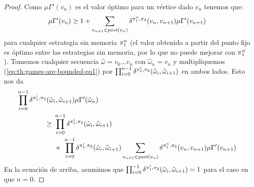 \begin{proof}
  Como $\mu \Gamma'(v_n)$ es el valor óptimo para un vértice dado $v_{n}$ tenemos que:
  \begin{equation}\label{eq:th:games-are-bounded-eq1}
    \mu \Gamma'(v_n) \geq 1 + \sum_{v_{n+1} \in \mathit{post}(v_n)} \delta^{\pi_{1}^n, \pi_{2}}(v_n, v_{n+1}) \mu \Gamma'(v_{n+1})
  \end{equation}
  para cualquier estrategia sin memoria $\pi_{1}^n$ (el valor obtenido a partir del punto fijo es
  óptimo entre las estrategias sin memoria, por lo que no puede mejorar con  $\pi_{1}^n$).
  Tomemos cualquier secuencia $\hat{\omega} = v_0 \dots v_n$ con
  $\hat{\omega}_n = v_n$ y multipliquemos
  (\ref{eq:th:games-are-bounded-eq1}) por
  $\prod^{n-1}_{i=0} \delta^{\pi_{1}^i, \pi_{2}}(\hat{\omega}_i, \hat{\omega}_{i+1})$
  en ambos lados. Esto nos da
  \begin{align}
    \prod^{n-1}_{i=0} \delta^{\strat{1}^i, \strat{2}}(\hat{\omega}_i, \hat{\omega}_{i+1}) \mu \Gamma'(\hat{\omega}_n)  \hspace{-6.5em}& \notag\\
    \geq \ & \prod^{n-1}_{i=0} \delta^{\strat{1}^i, \strat{2}}(\hat{\omega}_i, \hat{\omega}_{i+1}) \label{eq:th:games-are-bounded-eq2} \\
    & + \ \prod^{n-1}_{i=0} \delta^{\strat{1}^i, \strat{2}}(\hat{\omega}_i, \hat{\omega}_{i+1})\sum_{v_{n+1} \in \post(v_n)} \delta^{\strat{1}^n, \strat{2}}(v_n, v_{n+1}) \mu \Gamma'(v_{n+1}) \notag
  \end{align}
  En la ecuación de arriba, asumimos que
  $\prod^{-1}_{i=0} \delta^{\pi_{1}^i, \pi_{2}}(\hat{\omega}_i, \hat{\omega}_{i+1}) = 1$
  para el caso en que $n=0$.
  

\end{proof}
